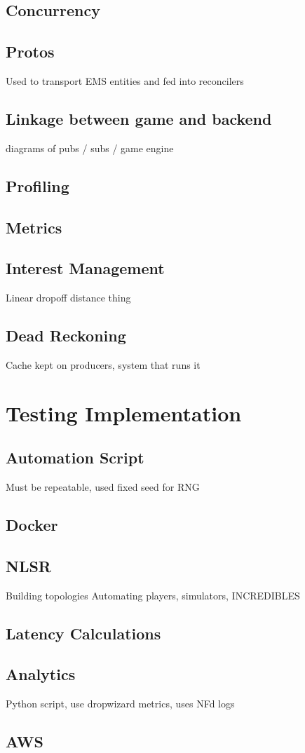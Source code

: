 \subsection{Concurrency}


\subsection{Protos}
Used to transport EMS entities and fed into reconcilers

\subsection{Linkage between game and backend}
diagrams of pubs / subs / game engine


\subsection{Profiling}

\subsection{Metrics}

\subsection*{Interest Management}\label{sec:impl:im}
Linear dropoff distance thing

\subsection*{Dead Reckoning}\label{sec:des:dr}
Cache kept on producers, system that runs it

\section{Testing Implementation}
\subsection{Automation Script}
Must be repeatable, used fixed seed for RNG

\subsection{Docker}


\subsection{NLSR}
Building topologies
Automating players, simulators, INCREDIBLES


\subsection{Latency Calculations}


\subsection{Analytics}
Python script, use dropwizard metrics, uses NFd logs


\subsection{AWS}


